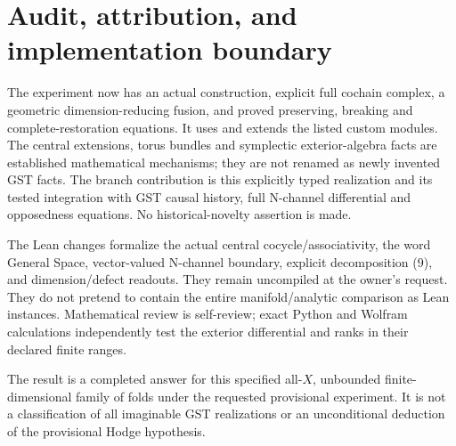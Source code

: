 \documentclass[11pt]{article}
\begin{document}
\section{Audit, attribution, and implementation boundary}
The experiment now has an actual construction, explicit full cochain
complex, a geometric dimension-reducing fusion, and proved preserving,
breaking and complete-restoration equations. It uses and extends the
listed custom modules. The central extensions, torus bundles and
symplectic exterior-algebra facts are established mathematical mechanisms;
they are not renamed as newly invented GST facts. The branch contribution
is this explicitly typed realization and its tested integration with GST
causal history, full N-channel differential and opposedness equations.
No historical-novelty assertion is made.

The Lean changes formalize the actual central cocycle/associativity,
the word General Space, vector-valued N-channel boundary, explicit
decomposition (9), and dimension/defect readouts. They remain uncompiled
at the owner's request. They do not pretend to contain the entire
manifold/analytic comparison as Lean instances. Mathematical review is
self-review; exact Python and Wolfram calculations independently test
the exterior differential and ranks in their declared finite ranges.

The result is a completed answer for this specified all-$X$, unbounded
finite-dimensional family of folds under the requested provisional
experiment. It is not a classification of all imaginable GST realizations
or an unconditional deduction of the provisional Hodge hypothesis.
\end{document}

